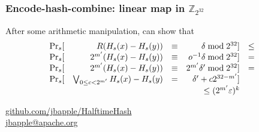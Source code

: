 \documentclass[xcolor=dvipsnames]{beamer}
\begin{document}
\begin{frame}
  \frametitle{Encode-hash-combine: linear map \textbf{in $\mathbb{Z}_{2^{32}}$}}

  After some arithmetic manipulation, can show that
  \[
  \begin{array}{l r c r c l}
    \Pr_s[&R(H_s(x) - H_s(y)) & \equiv & \delta \bmod 2^{32}] & \le & \\
    \Pr_s[&2^{m'}(H_s(x) - H_s(y)) & \equiv & o^{-1} \delta \bmod 2^{32}] & = & \\
    \Pr_s[&2^{m'}(H_s(x) - H_s(y)) & \equiv & 2^{m'} \delta' \bmod 2^{32}] & = & \\
    \Pr_s[&\bigvee_{0 \le c < 2^{m'}} H_s(x) - H_s(y) & = &  \delta'  + c 2^{32 -m'}] &  & \\
    & & &\le  (2^{m'} \varepsilon)^{k}
  \end{array}
  \]
\end{frame}

\begin{frame}
  \begin{center}
    \href{https://github.com/jbapple/HalftimeHash}{github.com/jbapple/HalftimeHash}
    $ $ \\
    $ $ \\
    \href{mailto:jbapple@apache.org}{\Large jbapple@apache.org}
  \end{center}
\end{frame}







\end{document}
